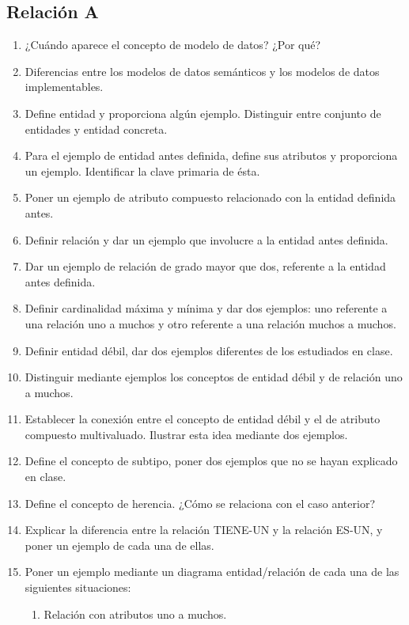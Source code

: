\subsection{Relación A}

\begin{enumerate}
    \item ¿Cuándo aparece el concepto de modelo de datos? ¿Por qué?
    \item Diferencias entre los modelos de datos semánticos y los modelos de datos implementables.
    \item Define entidad y proporciona algún ejemplo. Distinguir entre conjunto de entidades y entidad concreta.
    \item Para el ejemplo de entidad antes definida, define sus atributos y proporciona un ejemplo. Identificar la clave primaria de ésta.
    \item Poner un ejemplo de atributo compuesto relacionado con la entidad definida antes.
    \item Definir relación y dar un ejemplo que involucre a la entidad antes definida.
    \item Dar un ejemplo de relación de grado mayor que dos, referente a la entidad antes definida.
    \item Definir cardinalidad máxima y mínima y dar dos ejemplos: uno referente a una relación uno a muchos y otro referente a una relación muchos a muchos.
    \item Definir entidad débil, dar dos ejemplos diferentes de los estudiados en clase.
    \item Distinguir mediante ejemplos los conceptos de entidad débil y de relación uno a muchos.
    \item Establecer la conexión entre el concepto de entidad débil y el de atributo compuesto multivaluado. Ilustrar esta idea mediante dos ejemplos.
    \item Define el concepto de subtipo, poner dos ejemplos que no se hayan explicado en clase.
    \item Define el concepto de herencia. ¿Cómo se relaciona con el caso anterior?
    \item Explicar la diferencia entre la relación TIENE-UN y la relación ES-UN, y poner un ejemplo de cada una de ellas.
    \item Poner un ejemplo mediante un diagrama entidad/relación de cada una de las siguientes situaciones:
    \begin{enumerate}
        \item Relación con atributos uno a muchos.

\end{enumerate}
\end{enumerate}
